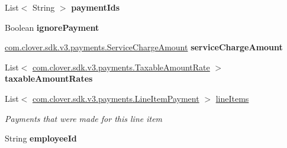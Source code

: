 \begin{DoxyCompactItemize}
\mbox{\label{classcom_1_1clover_1_1sdk_1_1v3_1_1payments_1_1_gift_card_transaction_a19c90ed1aa783de3c28043039caa3372}} 
List$<$ String $>$ {\bfseries payment\+Ids}
\item 
\mbox{\label{classcom_1_1clover_1_1sdk_1_1v3_1_1payments_1_1_gift_card_transaction_aed2d1eaccf0f720e698321c9b03b6b60}} 
Boolean {\bfseries ignore\+Payment}
\item 
\mbox{\label{classcom_1_1clover_1_1sdk_1_1v3_1_1payments_1_1_gift_card_transaction_a0f02dfd0839750249df0fc3d02d1fbe2}} 
\hyperlink{classcom_1_1clover_1_1sdk_1_1v3_1_1payments_1_1_service_charge_amount}{com.\+clover.\+sdk.\+v3.\+payments.\+Service\+Charge\+Amount} {\bfseries service\+Charge\+Amount}
\item 
\mbox{\label{classcom_1_1clover_1_1sdk_1_1v3_1_1payments_1_1_gift_card_transaction_a22e5623ae0057b227d786975e4172d07}} 
List$<$ \hyperlink{classcom_1_1clover_1_1sdk_1_1v3_1_1payments_1_1_taxable_amount_rate}{com.\+clover.\+sdk.\+v3.\+payments.\+Taxable\+Amount\+Rate} $>$ {\bfseries taxable\+Amount\+Rates}
\item 
List$<$ \hyperlink{classcom_1_1clover_1_1sdk_1_1v3_1_1payments_1_1_line_item_payment}{com.\+clover.\+sdk.\+v3.\+payments.\+Line\+Item\+Payment} $>$ \hyperlink{classcom_1_1clover_1_1sdk_1_1v3_1_1payments_1_1_gift_card_transaction_aa0b495fa50df930fb73bea83cf88862d}{line\+Items}
\begin{DoxyCompactList}\small\item\em Payments that were made for this line item \end{DoxyCompactList}\item 
\mbox{\label{classcom_1_1clover_1_1sdk_1_1v3_1_1payments_1_1_gift_card_transaction_af7adc933f78567f624ce8f8badc9cadc}} 
String {\bfseries employee\+Id}
\end{DoxyCompactItemize}


